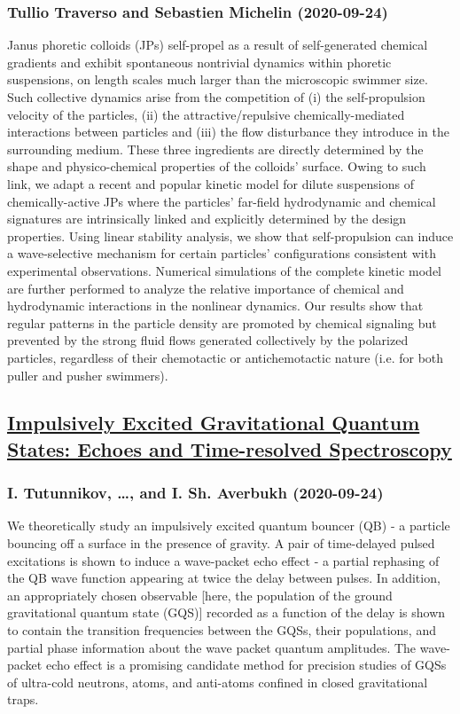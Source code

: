 \subsubsection*{Tullio Traverso and Sebastien Michelin (2020-09-24)}
Janus phoretic colloids (JPs) self-propel as a result of self-generated
chemical gradients and exhibit spontaneous nontrivial dynamics within phoretic
suspensions, on length scales much larger than the microscopic swimmer size.
Such collective dynamics arise from the competition of (i) the self-propulsion
velocity of the particles, (ii) the attractive/repulsive chemically-mediated
interactions between particles and (iii) the flow disturbance they introduce in
the surrounding medium. These three ingredients are directly determined by the
shape and physico-chemical properties of the colloids' surface. Owing to such
link, we adapt a recent and popular kinetic model for dilute suspensions of
chemically-active JPs where the particles' far-field hydrodynamic and chemical
signatures are intrinsically linked and explicitly determined by the design
properties. Using linear stability analysis, we show that self-propulsion can
induce a wave-selective mechanism for certain particles' configurations
consistent with experimental observations. Numerical simulations of the
complete kinetic model are further performed to analyze the relative importance
of chemical and hydrodynamic interactions in the nonlinear dynamics. Our
results show that regular patterns in the particle density are promoted by
chemical signaling but prevented by the strong fluid flows generated
collectively by the polarized particles, regardless of their chemotactic or
antichemotactic nature (i.e. for both puller and pusher swimmers).

\subsection*{\href{http://arxiv.org/abs/2009.11755v1}{Impulsively Excited Gravitational Quantum States: Echoes and  Time-resolved Spectroscopy}}
\subsubsection*{I. Tutunnikov, \dots, and I. Sh. Averbukh (2020-09-24)}
We theoretically study an impulsively excited quantum bouncer (QB) - a
particle bouncing off a surface in the presence of gravity. A pair of
time-delayed pulsed excitations is shown to induce a wave-packet echo effect -
a partial rephasing of the QB wave function appearing at twice the delay
between pulses. In addition, an appropriately chosen observable [here, the
population of the ground gravitational quantum state (GQS)] recorded as a
function of the delay is shown to contain the transition frequencies between
the GQSs, their populations, and partial phase information about the wave
packet quantum amplitudes. The wave-packet echo effect is a promising candidate
method for precision studies of GQSs of ultra-cold neutrons, atoms, and
anti-atoms confined in closed gravitational traps.

